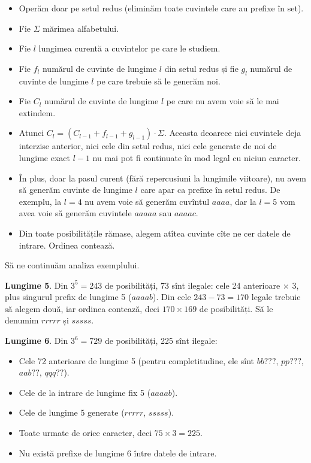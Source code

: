 \documentclass[../main.tex]{subfiles}
\begin{document}
\begin{itemize}
  \item Operăm doar pe setul redus (eliminăm toate cuvintele care au prefixe în set).
  \item Fie $\Sigma$ mărimea alfabetului.
  \item Fie $l$ lungimea curentă a cuvintelor pe care le studiem.
  \item Fie $f_l$ numărul de cuvinte de lungime $l$ din setul redus și fie $g_l$ numărul de cuvinte de lungime $l$ pe care trebuie să le generăm noi.
  \item Fie $C_l$ numărul de cuvinte de lungime $l$ pe care nu avem voie să le mai extindem.
  \item Atunci $C_l = (C_{l-1} + f_{l- 1} + g_{l - 1}) \cdot \Sigma$. Aceasta deoarece nici cuvintele deja interzise anterior, nici cele din setul redus, nici cele generate de noi de lungime exact $l - 1$ nu mai pot fi continuate în mod legal cu niciun caracter.
  \item În plus, doar la pasul curent (fără repercusiuni la lungimile viitoare), nu avem să generăm cuvinte de lungime $l$ care apar ca prefixe în setul redus. De exemplu, la $l=4$ nu avem voie să generăm cuvîntul $aaaa$, dar la $l=5$ vom avea voie să generăm cuvintele $aaaaa$ sau $aaaac$.
  \item Din toate posibilitățile rămase, alegem atîtea cuvinte cîte ne cer datele de intrare. Ordinea contează.
\end{itemize}

Să ne continuăm analiza exemplului.

\textbf{Lungime 5}. Din $3^5 = 243$ de posibilități, 73 sînt ilegale: cele 24 anterioare $\times$ 3, plus singurul prefix de lungime 5 ($aaaab$). Din cele $243-73=170$ legale trebuie să alegem două, iar ordinea contează, deci $170 \times 169$ de posibilități. Să le denumim $rrrrr$ și $sssss$.

\textbf{Lungime 6}. Din $3^6 = 729$ de posibilități, 225 sînt ilegale:

\begin{itemize}
  \item Cele 72 anterioare de lungime 5 (pentru completitudine, ele sînt $bb???$, $pp???$, $aab??$, $qqq??$).
  \item Cele de la intrare de lungime fix 5 ($aaaab$).
  \item Cele de lungime 5 generate ($rrrrr$, $sssss$).
  \item Toate urmate de orice caracter, deci $75 \times 3 = 225$.
  \item Nu există prefixe de lungime 6 între datele de intrare.
\end{itemize}
\end{document}

